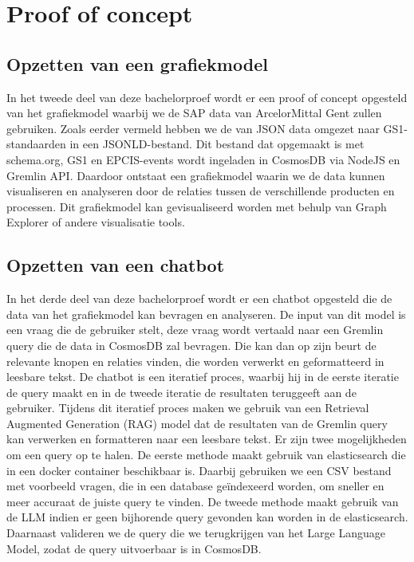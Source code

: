 \section{Proof of concept}
\subsection{Opzetten van een grafiekmodel}
In het tweede deel van deze bachelorproef wordt er een proof of concept opgesteld van het grafiekmodel waarbij we de SAP data van ArcelorMittal Gent zullen gebruiken.
Zoals eerder vermeld hebben we de van JSON data omgezet naar GS1-standaarden in een JSONLD-bestand. Dit bestand dat opgemaakt is met schema.org, GS1 en EPCIS-events wordt ingeladen in CosmosDB via NodeJS en Gremlin API.\@
Daardoor ontstaat een grafiekmodel waarin we de data kunnen visualiseren en analyseren door de relaties tussen de verschillende producten en processen.
Dit grafiekmodel kan gevisualiseerd worden met behulp van Graph Explorer of andere visualisatie tools.

\subsection{Opzetten van een chatbot}
In het derde deel van deze bachelorproef wordt er een chatbot opgesteld die de data van het grafiekmodel kan bevragen en analyseren.
De input van dit model is een vraag die de gebruiker stelt, deze vraag wordt vertaald naar een Gremlin query die de data in CosmosDB zal bevragen.
Die kan dan op zijn beurt de relevante knopen en relaties vinden, die worden verwerkt en geformatteerd in leesbare tekst.
De chatbot is een iteratief proces, waarbij hij in de eerste iteratie de query maakt en in de tweede iteratie de resultaten teruggeeft aan de gebruiker.
Tijdens dit iteratief proces maken we gebruik van een Retrieval Augmented Generation (RAG) model dat de resultaten van de Gremlin query kan verwerken en formatteren naar een leesbare tekst.
Er zijn twee mogelijkheden om een query op te halen. De eerste methode maakt gebruik van elasticsearch die in een docker container beschikbaar is. 
Daarbij gebruiken we een CSV bestand met voorbeeld vragen, die in een database geïndexeerd worden, om sneller en meer accuraat de juiste query te vinden.
De tweede methode maakt gebruik van de LLM indien er geen bijhorende query gevonden kan worden in de elasticsearch.
Daarnaast valideren we de query die we terugkrijgen van het Large Language Model, zodat de query uitvoerbaar is in CosmosDB.\@

